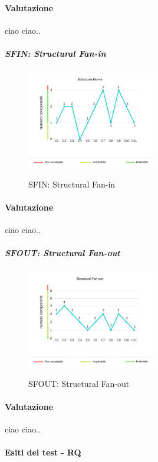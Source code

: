 	\paragraph*{Valutazione} ciao ciao..
	\pagebreak
	\subparagraph{SFIN: Structural Fan-in}
	\begin{center}
		\begin{figure}[h] 
			\centering 
			\includegraphics[width=0.5\textwidth]{res/images/new/sfin.png}\\
			\caption{SFIN: Structural Fan-in}
		\end{figure}
	\end{center}
	\paragraph*{Valutazione} ciao ciao..
	\pagebreak
	\subparagraph{SFOUT: Structural Fan-out}
	\begin{center}
		\begin{figure}[h] 
			\centering 
			\includegraphics[width=0.5\textwidth]{res/images/new/sfout.png}\\
			\caption{SFOUT: Structural Fan-out}
		\end{figure}
	\end{center}
	\paragraph*{Valutazione} ciao ciao..
	\pagebreak
	
		\paragraph{Esiti dei test - RQ}
	
